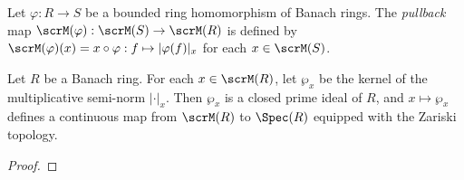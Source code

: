    \begin{definition}\label{def:pullback_of_ring_homomorphism_of_banach_rings_on_spectrum}
        Let \(\varphi: R \to S\) be a bounded ring homomorphism of Banach rings.
        The \emph{pullback} map \(\scrM(\varphi): \scrM(S) \to \scrM(R)\) is defined by \(\scrM(\varphi)(x) = x \circ \varphi: f \mapsto |\varphi(f)|_x\) for each \(x \in \scrM(S)\).
    \end{definition}




    \begin{proposition}\label{prop:map_from_M_R_to_Spec_R}
        Let \(R\) be a Banach ring.
        For each \(x \in \scrM(R)\), let \(\wp_x\) be the kernel of the multiplicative semi-norm \(|\cdot|_x\).
        Then \(\wp_x\) is a closed prime ideal of \(R\), and \(x \mapsto \wp_x\) defines a continuous map from \(\scrM(R)\) to \(\Spec(R)\) equipped with the Zariski topology.
    \end{proposition}
    \begin{proof}
    \end{proof}

